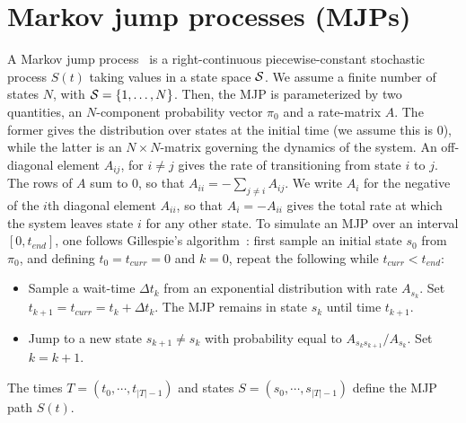 \section{Markov jump processes (MJPs)} 
A Markov jump process~\citep{Cinlar1975} is a right-continuous piecewise-constant stochastic process $S(t)$ taking values in a state space ${\mathcal S}$. %
We assume a finite number of states $N$, with ${\mathcal S} = \{1,\ldots,N\}$. 
Then, the MJP is parameterized by two quantities, an $N$-component probability vector $\pi_0$ and a rate-matrix $A$. 
The former gives the distribution over states at the initial time (we assume this is $0$), while the latter is an $N \times N$-matrix governing the dynamics of the system.  
An off-diagonal element $A_{ij}$, for $i \neq j$ gives the rate of transitioning from state $i$ to $j$. 
The rows of $A$ sum to $0$, so that $A_{ii}=-\sum_{j \neq i} A_{ij}  $. 
We write $A_i$ for the negative of the $i$th diagonal element $A_{ii}$, so that $A_i = -A_{ii}$ gives the total rate at which the system leaves state $i$ for any other state.
To simulate an MJP over an interval $[0,t_{end}]$, one follows Gillespie's algorithm~\citep{gillespie97}: 
first sample an initial state $s_0$ from $\pi_0$, and defining $t_0 = t_{curr} = 0$ and $k = 0$, repeat the following while $t_{curr} < t_{end}$:
\begin{itemize}
  \item Sample a wait-time $\Delta t_k$ from an exponential distribution with rate $A_{s_k}$.  
    Set $t_{k+1} = t_{curr} = t_{k} + \Delta t_k$. 
    The MJP remains in state $s_k$ until time $t_{k+1}$.
  \item Jump to a new state $s_{k+1} \neq s_k$ with probability equal to $A_{s_ks_{k+1}}/A_{s_k}$. Set $k=k+1$.
\end{itemize}
The times $T=(t_0, \cdots, t_{|T| - 1})$ and states $S=(s_0, \cdots, s_{|T| - 1 })$ define the MJP path $S(t)$.

